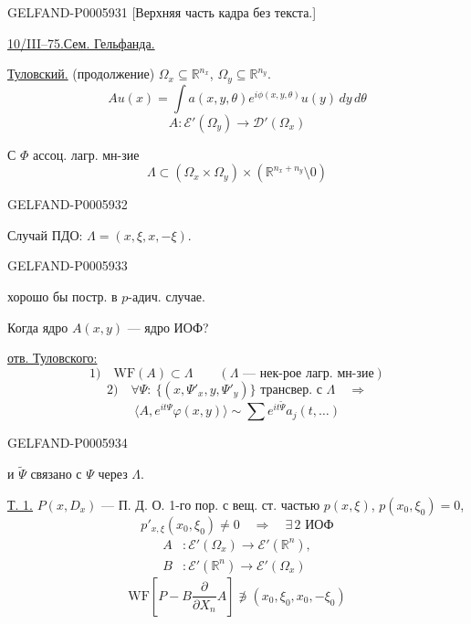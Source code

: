 \begin{GelfandAdjacentEvidence}{GELFAND-P000593}{1}
[Верхняя часть кадра без текста.]

\underline{10/III--75.}\qquad \underline{Сем. Гельфанда.}

\underline{Туловский.} (продолжение)
\(\Omega_x\subseteq\mathbb R^{n_x}\), \(\Omega_y\subseteq\mathbb R^{n_y}\).
\[
Au(x)=\int a(x,y,\theta)e^{i\phi(x,y,\theta)}u(y)\,dy\,d\theta
\]
\[
A:\mathcal E'(\Omega_y)\longrightarrow\mathcal D'(\Omega_x)
\]

С \(\Phi\) ассоц. лагр. мн-зие
\[
\Lambda\subset(\Omega_x\times\Omega_y)\times(\mathbb R^{n_x+n_y}\setminus0)
\]
\end{GelfandAdjacentEvidence}
\begin{GelfandAdjacentEvidence}{GELFAND-P000593}{2}

Случай ПДО: \(\Lambda=(x,\xi,x,-\xi)\).
\end{GelfandAdjacentEvidence}
\begin{GelfandAdjacentEvidence}{GELFAND-P000593}{3}


 хорошо бы постр. в \(p\)-адич. случае.

Когда ядро \(A(x,y)\) — ядро ИОФ?

\underline{отв. Туловского:}
\[
1)\quad \mathrm{WF}(A)\subset\Lambda\qquad (\Lambda\text{ — нек-рое лагр. мн-зие})
\]
\[
2)\quad\forall\Psi:\ \{(x,\Psi'_x,y,\Psi'_y)\}\text{ трансвер. с }\Lambda
\quad\Rightarrow
\]
\[
\langle A,e^{it\Psi}\varphi(x,y)\rangle\sim
\sum e^{it\widetilde\Psi}a_j(t,\ldots)
\]
\end{GelfandAdjacentEvidence}
\begin{GelfandAdjacentEvidence}{GELFAND-P000593}{4}

и \(\widetilde\Psi\) связано с \(\Psi\) через \(\Lambda\).

\underline{\underline{Т. 1.}}
\(P(x,D_x)\) — П. Д. О. 1-го пор. с вещ. ст. частью \(p(x,\xi)\), \(p(x_0,\xi_0)=0\),
\[
p'_{x,\xi}(x_0,\xi_0)\ne0\quad\Rightarrow\quad\exists\,2\text{ ИОФ}
\]
\[
\begin{aligned}
A&:\mathcal E'(\Omega_x)\longrightarrow\mathcal E'(\mathbb R^n),\\
B&:\mathcal E'(\mathbb R^n)\longrightarrow\mathcal E'(\Omega_x)
\end{aligned}
\]
\[
\mathrm{WF}\left[P-B\frac{\partial}{\partial X_n}A\right]
\not\ni(x_0,\xi_0,x_0,-\xi_0)
\]
\end{GelfandAdjacentEvidence}
